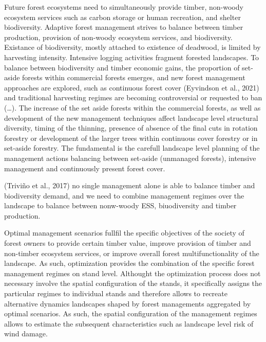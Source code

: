 \documentclass[]{elsarticle} %
\begin{document}
Future forest ecosystems need to simultaneously provide timber,
non-woody ecosystem services such as carbon storage or human recreation,
and shelter biodiversity. Adaptive forest management strives to balance
between timber production, provision of non-woody ecosystem services,
and biodiversity. Existance of biodiversity, mostly attached to
existence of deadwood, is limited by harvesting intensity. Intensive
logging activities fragment forested landscapes. To balance between
biodiversity and timber economic gains, the proportion of set-aside
forests within commercial forests emerges, and new forest management
approaches are explored, such as continuous forest cover (Eyvindson et
al., 2021) and traditional harvesting regimes are becoming controversial
or requested to ban (\ldots{}). The increase of the set aside forests
within the commercial forests, as well as development of the new
management techniques affect landscape level structural diversity,
timing of the thinning, presence of absence of the final cuts in
rotation forestry or development of the larger trees within continuous
cover forestry or in set-aside forestry. The fundamental is the carefull
landscape level planning of the management actions balancing between
set-aside (unmanaged forests), intensive management and continuously
present forest cover.

(Triviño et al., 2017) no single management alone is able to balance
timber and biodiversity demand, and we need to combine management
regimes over the landscape to balance between nonw-woody ESS,
biuodiversity and timber production.

Optimal management scenarios fullfil the specific objectives of the
society of forest owners to provide certain timber value, improve
provision of timber and non-timber ecosystem services, or improve
overall forest multifunctionality of the landscape. As such,
optimization provides the combination of the specific forest management
regimes on stand level. Althought the optimization process does not
necessary involve the spatial configuration of the stands, it
specifically assigns the particular regimes to individual stands and
therefore allows to recreate alternative dynamics landscapes shaped by
forest managements aggregated by optimal scenarios. As such, the spatial
configuration of the management regimes allows to estimate the
subsequent characteristics such as landscape level risk of wind damage.
\end{document}
